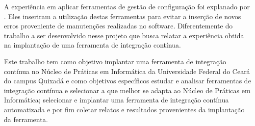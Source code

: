 A experiência em aplicar ferramentas de gestão de configuração foi explanado por . Eles inseriram a utilização destas ferramentas para evitar a inserção de novos erros proveniente de manutenções realizadas no software. Diferentemente do trabalho a ser desenvolvido nesse projeto que busca relatar a experiência obtida na implantação de uma ferramenta de integração contínua.

Este trabalho tem como objetivo implantar uma ferramenta de integração contínua no Núcleo de Práticas em Informática da Universidade Federal do Ceará do campus Quixadá e como objetivos específicos estudar e analisar ferramentas de integração contínua e selecionar a que melhor se adapta ao Núcleo de Práticas em Informática;
selecionar e implantar uma ferramenta de integração contínua automatizada e por fim coletar relatos e resultados provenientes da implantação da ferramenta.
